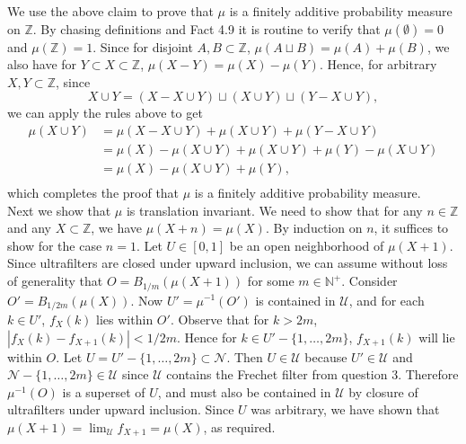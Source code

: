 \documentclass{article}
\begin{document}
\begin{enumerate}
    We use the above claim to prove that $\mu$ is a finitely additive
    probability measure on $\mathbb{Z}$. By chasing definitions and Fact
    4.9 it is routine to verify that $\mu(\emptyset)=0$ and
    $\mu(\mathbb{Z})=1$. Since for disjoint $A,B\subset\mathbb{Z}$,
    $\mu(A\sqcup B)=\mu(A)+\mu(B)$, we also have for $Y\subset
    X\subset\mathbb{Z}$, $\mu(X-Y)=\mu(X)-\mu(Y)$. Hence, for arbitrary
    $X,Y\subset\mathbb{Z}$, since
    \begin{equation*}
      X\cup Y = (X-X\cup Y)\sqcup(X\cup Y)\sqcup(Y-X\cup Y),
    \end{equation*}
    we can apply the rules above to get
    \begin{align*}
      \mu(X\cup Y) &= \mu(X-X\cup Y)+\mu(X\cup Y)+\mu(Y-X\cup Y) \\
                   &= \mu(X)-\mu(X\cup Y)+\mu(X\cup Y)+\mu(Y)-\mu(X\cup Y) \\
                   &= \mu(X)-\mu(X\cup Y)+\mu(Y), \\
    \end{align*}
    which completes the proof that $\mu$ is a finitely additive probability
    measure. \\

    Next we show that $\mu$ is translation invariant. We need to show that
    for any $n\in\mathbb{Z}$ and any $X\subset\mathbb{Z}$, we have
    $\mu(X+n)=\mu(X)$. By induction on $n$, it suffices to show for the
    case $n=1$. Let $U\in[0,1]$ be an open neighborhood of $\mu(X+1)$.
    Since ultrafilters are closed under upward inclusion, we can assume
    without loss of generality that $O=B_{1/m}(\mu(X+1))$ for some
    $m\in\mathbb{N}^+$. Consider $O'=B_{1/2m}(\mu(X))$. Now
    $U'=\mu^{-1}(O')$ is contained in $\mathcal{U}$, and for each $k\in
    U'$, $f_X(k)$ lies within $O'$. Observe that for $k>2m$,
    $|f_X(k)-f_{X+1}(k)|<1/2m$. Hence for $k\in U'-\{1,\ldots,2m\}$,
    $f_{X+1}(k)$ will lie within $O$. Let
    $U=U'-\{1,\ldots,2m\}\subset\mathcal{N}$. Then $U\in\mathcal{U}$
    because $U'\in\mathcal{U}$ and
    $\mathcal{N}-\{1,\ldots,2m\}\in\mathcal{U}$ since $\mathcal{U}$
    contains the Frechet filter from question 3. Therefore
    $\mu^{-1}(O)$ is a superset of $U$, and must
    also be contained in $\mathcal{U}$ by closure of ultrafilters under
    upward inclusion. Since $U$ was arbitrary, we have shown that
    $\mu(X+1)=\lim_\mathcal{U}f_{X+1}=\mu(X)$, as required.
\end{enumerate}
\end{document}
